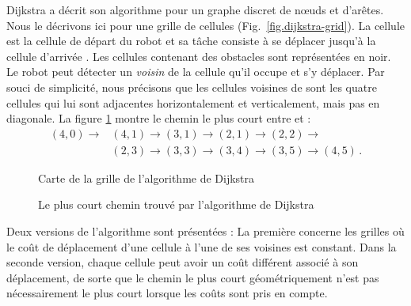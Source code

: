 Dijkstra a décrit son algorithme pour un graphe discret de nœuds et d'arêtes. Nous le décrivons ici pour une grille de cellules (Fig.~\ref{fig.dijkstra-grid}). La cellule  est la cellule de départ du robot et sa tâche consiste à se déplacer jusqu'à la cellule d'arrivée . Les cellules contenant des obstacles sont représentées en noir. Le robot peut détecter un \emph{voisin} de la cellule  qu'il occupe et s'y déplacer. Par souci de simplicité, nous précisons que les cellules voisines de  sont les quatre cellules qui lui sont adjacentes horizontalement et verticalement, mais pas en diagonale. La figure \ref{fig.dijkstra-path} montre le chemin le plus court entre  et  :
\[
\begin{array}{ll}
(4,0) \rightarrow &(4,1)\rightarrow (3,1) \rightarrow (2,1) \rightarrow (2,2) \rightarrow \\
&(2,3) \rightarrow (3,3) \rightarrow (3,4) \rightarrow (3,5) \rightarrow (4,5)\,.
\end{array}
\]
\begin{figure}
\begin{minipage}{.5\textwidth}
\caption{Carte de la grille de l'algorithme de Dijkstra}
\label{fig.dijkstra-grid}
\end{minipage}
\hspace{\fill}
\begin{minipage}{.5\textwidth}
\caption{Le plus court chemin trouvé par l'algorithme de Dijkstra}
\label{fig.dijkstra-path}
\end{minipage}
\end{figure}

Deux versions de l'algorithme sont présentées : La première concerne les grilles où le coût de déplacement d'une cellule à l'une de ses voisines est constant. Dans la seconde version, chaque cellule peut avoir un coût différent associé à son déplacement, de sorte que le chemin le plus court géométriquement n'est pas nécessairement le plus court lorsque les coûts sont pris en compte.

